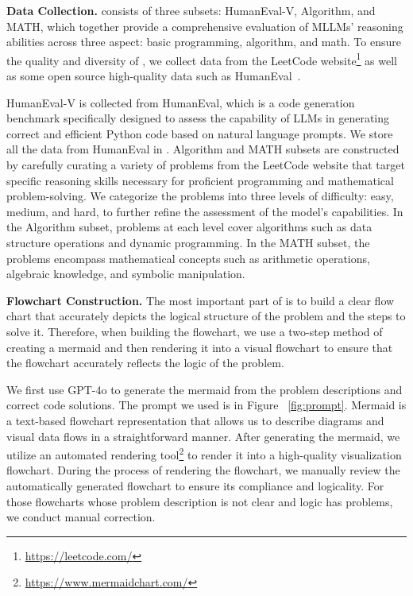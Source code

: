 \textbf{Data Collection.} \benchmark consists of three subsets: HumanEval-V, Algorithm, and MATH, which together provide a comprehensive evaluation of MLLMs' reasoning abilities across three aspect: basic programming, algorithm, and math. To ensure the quality and diversity of \benchmark, we collect data from the LeetCode website\footnote{\url{https://leetcode.com/}} as well as some open source high-quality data such as HumanEval~\cite{chen2021evaluatinglargelanguagemodels}.

HumanEval-V is collected from HumanEval, which is a code generation benchmark specifically designed to assess the capability of LLMs in generating correct and efficient Python code based on natural language prompts. We store all the data from HumanEval in \benchmark. Algorithm and MATH subsets are constructed by carefully curating a variety of problems from the LeetCode website that target specific reasoning skills necessary for proficient programming and mathematical problem-solving. We categorize the problems into three levels of difficulty: easy, medium, and hard, to further refine the assessment of the model's capabilities. In the Algorithm subset, problems at each level cover algorithms such as data structure operations and dynamic programming. In the MATH subset, the problems encompass mathematical concepts such as arithmetic operations, algebraic knowledge, and symbolic manipulation.



\textbf{Flowchart Construction. } The most important part of \benchmark is to build a clear flow chart that accurately depicts the logical structure of the problem and the steps to solve it. Therefore, when building the flowchart, we use a two-step method of creating a mermaid and then rendering it into a visual flowchart to ensure that the flowchart accurately reflects the logic of the problem.

We first use GPT-4o to generate the mermaid from the problem descriptions and correct code solutions. The prompt we used is in Figure ~\ref{fig:prompt}. Mermaid is a text-based flowchart representation that allows us to describe diagrams and visual data flows in a straightforward manner. After generating the mermaid, we utilize an automated rendering tool\footnote{\url{https://www.mermaidchart.com/}} to render it into a high-quality visualization flowchart. During the process of rendering the flowchart, we manually review the automatically generated flowchart to ensure its compliance and logicality. For those flowcharts whose problem description is not clear and logic has problems, we conduct manual correction.





